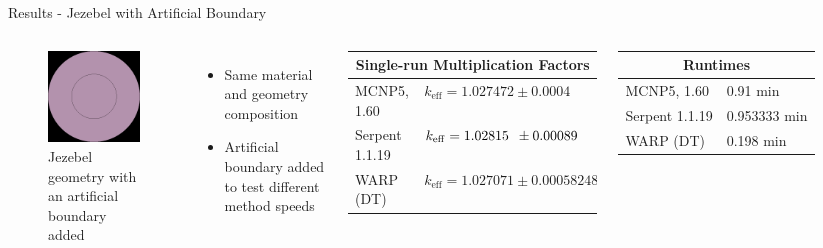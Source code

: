 \documentclass[xcolor=x11names, compress]{beamer}
\renewcommand{\(}{\begin{columns}}
\renewcommand{\)}{\end{columns}}
\newcommand{\<}[1]{\begin{column}{#1}}
\renewcommand{\>}{\end{column}}
\begin{document}
\begin{frame}{Results - Jezebel with Artificial Boundary}
\begin{columns}
	\begin{figure}[h!]
	\includegraphics[width=1.5in]{../figs/jezebel-shells}
	\caption*{Jezebel geometry with an artificial boundary added \label{jezebel-shells}}
	\end{figure}
	\begin{itemize}
	\item{Same material and geometry composition}
	\item{Artificial boundary added to test different method speeds}
	\end{itemize}
	\pause
	\begin{table}[h]
	\begin{tabular}{ll}
	\multicolumn{2}{c}{Single-run Multiplication Factors} \\ \hline
	MCNP5, 1.60 & $k_{\mathrm{eff}} = 1.027472 \pm 0.0004$ \\
	Serpent 1.1.19 & $k_{\mathrm{eff}} = 1.02815\hspace*{0.5em}\pm 0.00089$ \\
	WARP (DT) & $k_{\mathrm{eff}} = 1.027071 \pm 0.00058248$
	\end{tabular}
	\end{table}
	\begin{table}[h]
	\begin{tabular}{ll}
	\multicolumn{2}{c}{Runtimes} \\ \hline
	MCNP5, 1.60 & 0.91 min \\
	Serpent 1.1.19 & 0.953333 min \\
	WARP (DT) & 0.198 min %
	\end{tabular}
	\end{table}
\end{columns}
\end{frame}
\end{document}

